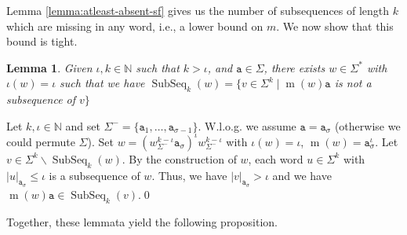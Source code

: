 \documentclass[10pt,a4paper]{amsart}
\makeatletter
\newcommand{\N}{\mathbb{N}}
\def\ta{\mathtt{a}}
\def\m{\operatorname{m}}
\DeclareMathOperator\ScatFact{SubSeq}
\newif\ifpaper
\theoremstyle{plain}
\newtheorem{lemma}{Lemma}
\theoremstyle{definition}
\renewenvironment{proof}[1][\proofname]{\par
  \pushQED{}%
  \normalfont \topsep6\p@\@plus6\p@\relax
  \trivlist
  \item[\hskip\labelsep\itshape #1\@addpunct{.}]\ignorespaces
}{%
  \popQED\endtrivlist\@endpefalse
}
\makeatother
\begin{document}

\ifpaper
\else
Lemma \ref{lemma:atleast-absent-sf} gives us the number of subsequences of length $k$ which are missing in any word, i.e., a lower bound on $m$. We now show that this bound is tight.%
\fi


\ifpaper
\else
\begin{lemma}\label{lemma:min-absent-sf-strucure}
    Given $\iota,k\in\N$ such that $k > \iota$, and $\ta\in\Sigma$, there exists $w\in\Sigma^*$ with $\iota(w) = \iota$ such that we have $\ScatFact_k(w)=\{v\in \Sigma^k\mid \m(w)\ta$ is not a subsequence of $v\}$
\end{lemma}

\begin{proof}
Let $k,\iota\in\N$ and set $\Sigma^-=\{\ta_1,\ldots,\ta_{\sigma-1}\}$. W.l.o.g. we assume $\ta=\ta_{\sigma}$ (otherwise we could permute $\Sigma$).
    Set $w = (w_{\Sigma^-}^{k-\iota}\ta_\sigma)^{\iota}w_{\Sigma^-}^{k-\iota}$ with $\iota(w)=\iota$, $\m(w)=\ta_{\sigma}^{\iota}$. 
    Let $v\in\Sigma^k\backslash\ScatFact_k(w)$. By the construction of $w$, each word $u\in\Sigma^k$ with $|u|_{\ta_{\sigma}}\leq\iota$ is a subsequence of $w$. Thus, we have $|v|_{\ta_{\sigma}}>\iota$ and we have $\m(w)\ta\in\ScatFact_k(v)$.\qed
\end{proof}

\fi

\ifpaper
\else
Together, these lemmata yield the following proposition.
\fi
\end{document}
